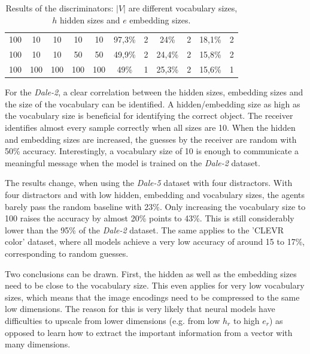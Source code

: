 \begin{table}[h]
\begin{tabular}{ccccc|cc|cc|cc}
        {100} & {10}    & {10}    & {10}    & {10}    & {97,3\%}                            & {2}                                 & {24\%}                                   & {2}             & {18,1\%}          & {2}             \\
        {100} & {10}    & {10}    & {50}    & {50}    & {49,9\%}                            & {2}                                 & {24,4\%}                                 & {2}             & {15,8\%}          & {2}             \\
        {100} & {100}   & {100}   & {100}   & {100}   & {49\%}                              & {1}                                 & {25,3\%}                                 & {2}             & {15,6\%}          & {1}             \\
        \bottomrule
    \end{tabular}
    \caption{Results of the discriminators: $|V|$ are different vocabulary sizes, $h$ hidden sizes and $e$ embedding sizes.}
    \label{tab:results_discriminator}
\end{table}

For the \emph{Dale-2}, a clear correlation between the hidden sizes, embedding sizes and the size of the vocabulary can be identified.
A hidden/embedding size as high as the vocabulary size is beneficial for identifying the correct object.
The receiver identifies almost every sample correctly when all sizes are 10.
When the hidden and embedding sizes are increased, the guesses by the receiver are random with 50\% accuracy.
Interestingly, a vocabulary size of 10 is enough to communicate a meaningful message when the model is trained on the \emph{Dale-2} dataset.

The results change, when using the \emph{Dale-5} dataset with four distractors.
With four distractors and with low hidden, embedding and vocabulary sizes, the agents barely pass the random baseline with 23\%.
Only increasing the vocabulary size to 100 raises the accuracy by almost 20\% points to 43\%.
This is still considerably lower than the 95\% of the \emph{Dale-2} dataset.
The same applies to the 'CLEVR color' dataset, where all models achieve a very low accuracy of around 15 to 17\%, corresponding to random guesses.


Two conclusions can be drawn.
First, the hidden as well as the embedding sizes need to be close to the vocabulary size.
This even applies for very low vocabulary sizes, which means that the image encodings need to be compressed to the same low dimensions.
The reason for this is very likely that neural models have difficulties to upscale from lower dimensions (e.g. from low $h_r$ to high $e_r$) as opposed to learn how to extract the important information from a vector with many dimensions.

